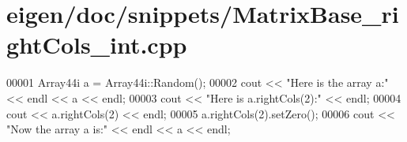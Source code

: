 \hypertarget{eigen_2doc_2snippets_2_matrix_base__right_cols__int_8cpp_source}{}\section{eigen/doc/snippets/\+Matrix\+Base\+\_\+right\+Cols\+\_\+int.cpp}
\label{eigen_2doc_2snippets_2_matrix_base__right_cols__int_8cpp_source}

\begin{DoxyCode}
00001 Array44i a = Array44i::Random();
00002 cout << \textcolor{stringliteral}{"Here is the array a:"} << endl << a << endl;
00003 cout << \textcolor{stringliteral}{"Here is a.rightCols(2):"} << endl;
00004 cout << a.rightCols(2) << endl;
00005 a.rightCols(2).setZero();
00006 cout << \textcolor{stringliteral}{"Now the array a is:"} << endl << a << endl;
\end{DoxyCode}
